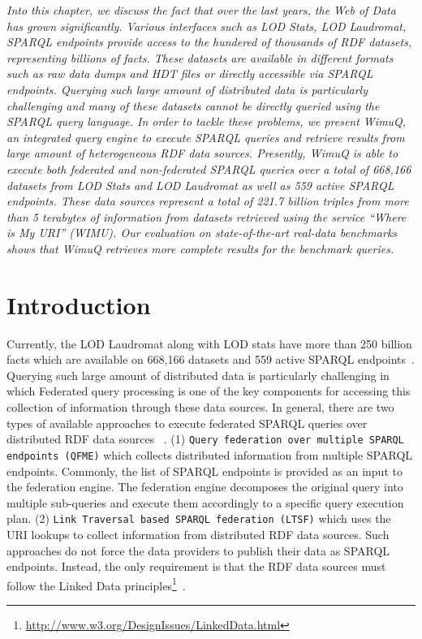 \textit{Into this chapter, we discuss the fact that over the last years, the Web of Data has grown significantly. Various interfaces such as LOD Stats, LOD Laudromat, SPARQL endpoints provide access to the hundered of thousands of RDF datasets, representing billions of facts. These datasets are available in different formats such as raw data dumps and HDT files or directly accessible via SPARQL endpoints. Querying such large amount of distributed data is particularly challenging and many of these datasets cannot be directly queried using the SPARQL query language. In order to tackle these problems, we present WimuQ, an integrated query engine to execute SPARQL queries and retrieve results from large amount of heterogeneous RDF data sources. Presently, WimuQ is able to execute both federated and non-federated SPARQL queries over a total of 668,166 datasets from LOD Stats and LOD Laudromat as well as 559 active SPARQL endpoints. These data sources represent a total of 221.7 billion triples from more than 5 terabytes of information from datasets retrieved using the service ``Where is My URI'' (WIMU). Our evaluation on state-of-the-art real-data benchmarks shows that WimuQ retrieves more complete results for the benchmark queries. }	

\section{Introduction}
\label{sec:intro}

Currently, the LOD Laudromat along with LOD stats have more than 250 billion facts which are available on 668,166 datasets and 559 active SPARQL endpoints~\cite{valdestilhas2018my}. Querying such large amount of distributed data is particularly challenging in which Federated query processing is one of the key components for accessing this collection of information through these data sources. In general, there are two types of available approaches to execute federated SPARQL queries over distributed RDF data sources~ \cite{saleem2015fine}. (1) \texttt{Query federation over multiple SPARQL endpoints (QFME)} which collects distributed information from multiple SPARQL endpoints. Commonly, the list of SPARQL endpoints is provided as an input to the federation engine. The federation engine decomposes the original query into multiple sub-queries and execute them accordingly to a specific query execution plan. (2) \texttt{Link Traversal based SPARQL federation (LTSF)} which uses the URI lookups to collect information from distributed RDF data sources. Such approaches do not force the data providers to publish their data as SPARQL endpoints. Instead, the only requirement is that the RDF data sources must follow the Linked Data principles\footnote{\url{http://www.w3.org/DesignIssues/LinkedData.html}}~\cite{hartig2013overview}. 


